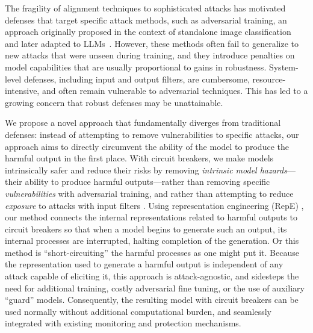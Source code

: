 The fragility of alignment techniques to sophisticated attacks has motivated defenses that target specific attack methods, such as adversarial training, an approach originally proposed in the context of standalone image classification~\citep{madry2017towards} and later adapted to LLMs~\citep{mazeika2024harmbench}.
However, these methods often fail to generalize to new attacks that were unseen during training, and they introduce penalties on model capabilities that are usually proportional to gains in robustness. System-level defenses, including input and output filters, are cumbersome, resource-intensive, and often remain vulnerable to adversarial techniques. This has led to a growing concern that robust defenses may be unattainable.

We propose a novel approach that fundamentally diverges from traditional defenses: instead of attempting to remove vulnerabilities to specific attacks, our approach aims to directly circumvent the ability of the model to produce the harmful output in the first place. With circuit breakers, we make models intrinsically safer and reduce their risks by removing \textit{intrinsic model hazards}---their ability to produce harmful outputs---rather than removing specific \textit{vulnerabilities} with adversarial training, and rather than attempting to reduce \textit{exposure} to attacks with input filters \citep{Leveson2012EngineeringAS,Hendrycks2024Intro}. Using representation engineering (RepE) \citep{zou2023representation}, our method connects the internal representations related to harmful outputs to circuit breakers so that when a model begins to generate such an output, its internal processes are interrupted, halting completion of the generation. Or this method is ``short-circuiting'' the harmful processes as one might put it. Because the representation used to generate a harmful output is independent of any attack capable of eliciting it, this approach is attack-agnostic, and sidesteps the need for additional training, costly adversarial fine tuning, or the use of auxiliary ``guard'' models. Consequently, the resulting model with circuit breakers can be used normally without additional computational burden, and seamlessly integrated with existing monitoring and protection mechanisms.


